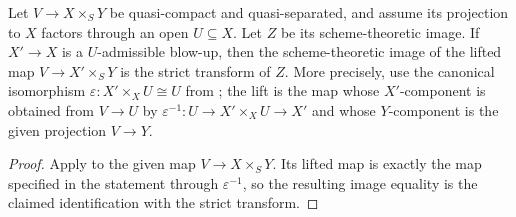 \begin{lemma}
  \label{lemma:nagata-scheme-image-strict-transform}
  \leanok

  Let $V\to X\times_SY$ be quasi-compact and quasi-separated, and assume its
  projection to $X$ factors through an open $U\subseteq X$.  Let $Z$ be its
  scheme-theoretic image.  If $X'\to X$ is a $U$-admissible blow-up, then the scheme-theoretic
  image of the lifted map $V\to X'\times_SY$ is the strict transform of $Z$.
  More precisely, use the canonical isomorphism
  $\varepsilon\colon X'\times_XU\cong U$ from
  ; the lift is the map whose
  $X'$-component is obtained from $V\to U$ by
  $\varepsilon^{-1}\colon U\to X'\times_XU\to X'$ and whose $Y$-component is
  the given projection $V\to Y$.
\end{lemma}

\begin{proof}
  \leanok
  Apply  to the
  given map $V\to X\times_SY$.  Its lifted map is exactly the map specified in
  the statement through $\varepsilon^{-1}$, so the resulting image equality is
  the claimed identification with the strict transform.
\end{proof}

